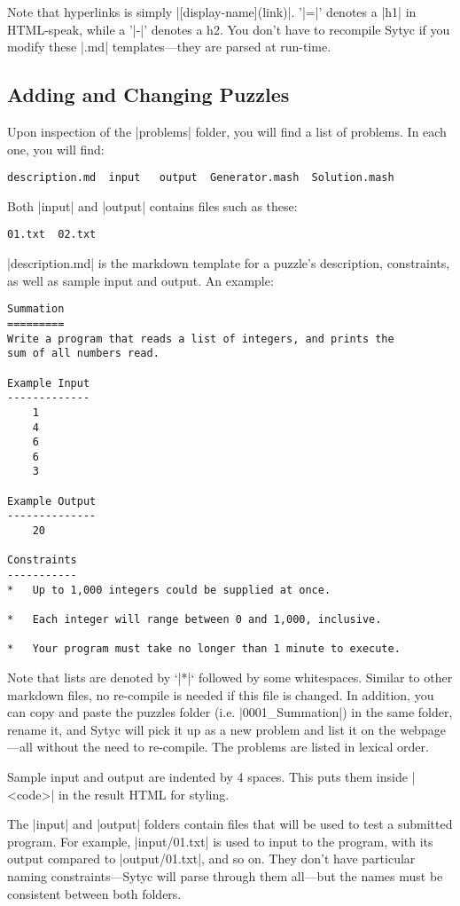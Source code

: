 \documentclass[a4paper]{article}
\begin{document}
Note that hyperlinks is simply |[display-name](link)|. '|=|' denotes a |h1| in HTML-speak, while a '|-|' denotes a h2.  You don't have to recompile Sytyc if you modify these |.md| templates---they are parsed at run-time.

\subsection{Adding and Changing Puzzles}

Upon inspection of the |problems| folder, you will find a list of problems.  In each one, you will find:
\begin{verbatim}
description.md  input   output  Generator.mash  Solution.mash
\end{verbatim}

Both |input| and |output| contains files such as these:
\begin{verbatim}
01.txt  02.txt
\end{verbatim}

|description.md| is the markdown template for a puzzle's description, constraints, as well as sample input and output.  An example:
\begin{verbatim}
Summation
=========
Write a program that reads a list of integers, and prints the
sum of all numbers read.

Example Input
-------------
    1
    4
    6
    6
    3

Example Output
--------------
    20
    
Constraints
-----------
*   Up to 1,000 integers could be supplied at once.

*   Each integer will range between 0 and 1,000, inclusive.

*   Your program must take no longer than 1 minute to execute.
\end{verbatim}

Note that lists are denoted by `|*|` followed by some whitespaces.  Similar to other markdown files, no re-compile is needed if this file is changed.  In addition, you can copy and paste the puzzles folder (i.e. |0001_Summation|) in the same folder, rename it, and Sytyc will pick it up as a new problem and list it on the webpage---all without the need to re-compile.  The problems are listed in lexical order.

Sample input and output are indented by 4 spaces. This puts them inside |<code>| in the result HTML for styling.

The |input| and |output| folders contain files that will be used to test a submitted program.  For example, |input/01.txt| is used to input to the program, with its output compared to |output/01.txt|, and so on.  They don't have particular naming constraints---Sytyc will parse through them all---but the names must be consistent between both folders.
\end{document}
